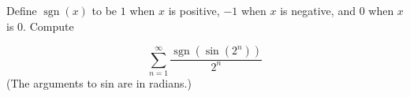 Define $\operatorname{sgn}(x)$ to be $1$ when $x$ is positive, $-1$ when $x$ is negative, and $0$ when $x$ is $0$. Compute

$$
\sum_{n=1}^{\infty} \frac{\operatorname{sgn}\left(\sin \left(2^{n}\right)\right)}{2^{n}}
$$
(The arguments to sin are in radians.)